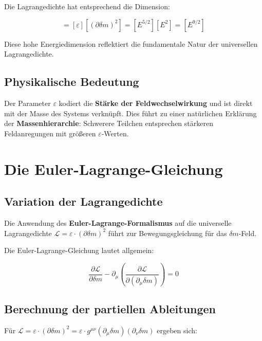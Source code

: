 \documentclass[12pt,a4paper]{report}
\begin{document}
	Die Lagrangedichte hat entsprechend die Dimension:
	
	\begin{equation}
		[\mathcal{L}] = [\varepsilon][(\partial\delta m)^2] = [E^{5/2}][E^2] = [E^{9/2}]
	\end{equation}
	
	Diese hohe Energiedimension reflektiert die fundamentale Natur der universellen Lagrangedichte.
	
	\subsection{Physikalische Bedeutung}
	
	Der Parameter $\varepsilon$ kodiert die \textbf{Stärke der Feldwechselwirkung} und ist direkt mit der Masse des Systems verknüpft. Dies führt zu einer natürlichen Erklärung der \textbf{Massenhierarchie}: Schwerere Teilchen entsprechen stärkeren Feldanregungen mit größeren $\varepsilon$-Werten.
	
	\section{Die Euler-Lagrange-Gleichung}
	
	\subsection{Variation der Lagrangedichte}
	
	Die Anwendung des \textbf{Euler-Lagrange-Formalismus} auf die universelle Lagrangedichte $\mathcal{L} = \varepsilon \cdot (\partial\delta m)^2$ führt zur Bewegungsgleichung für das $\delta m$-Feld.
	
	Die Euler-Lagrange-Gleichung lautet allgemein:
	
	\begin{equation}
		\frac{\partial\mathcal{L}}{\partial\delta m} - \partial_\mu\left(\frac{\partial\mathcal{L}}{\partial(\partial_\mu\delta m)}\right) = 0
	\end{equation}
	
	\subsection{Berechnung der partiellen Ableitungen}
	
	Für $\mathcal{L} = \varepsilon \cdot (\partial\delta m)^2 = \varepsilon \cdot g^{\mu\nu} (\partial_\mu\delta m)(\partial_\nu\delta m)$ ergeben sich:
	
\end{document}
